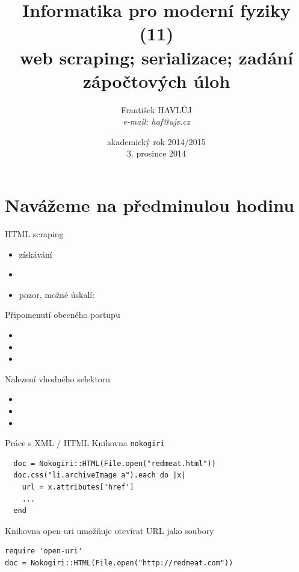 \documentclass{beamer}
\title[IMF (11)]{Informatika pro moderní fyziky (11)\\ web scraping; serializace; zadání zápočtových úloh}
\author[Franti\v{s}ek HAVL\r{U}J, ORF ÚJV Řež]{Franti\v{s}ek HAVL\r{U}J\\{\scriptsize \emph{e-mail: haf@ujv.cz}}}
\date{akademický rok 2014/2015\\3. prosince 2014}
\institute[ORF ÚJV Řež]
{ÚJV Řež\\oddělení Reaktorové fyziky a podpory palivového cyklu}
\begin{document}
\begin{frame}
  \titlepage
\end{frame}

\begin{frame}
  \tableofcontents
\end{frame}

\section{Navážeme na předminulou hodinu}

\begin{frame}{HTML scraping}
  \begin{itemize}
    \item získávání 
    \item 
    \item pozor, možné úskalí:
  \end{itemize}
\end{frame}

\begin{frame}{Připomenutí obecného postupu}
  \begin{itemize}
    \item 
    \item 
    \item 
  \end{itemize}
\end{frame}

\begin{frame}{Nalezení vhodného selektoru}
  \begin{itemize}
    \item 
    \item 
    \item 
  \end{itemize}
\end{frame}


\begin{frame}[fragile]{Práce s XML / HTML}
  Knihovna \texttt{nokogiri}
  \scriptsize
\begin{verbatim}
  doc = Nokogiri::HTML(File.open("redmeat.html"))
  doc.css("li.archiveImage a").each do |x|
    url = x.attributes['href']
    ...
  end
\end{verbatim}
\end{frame}

\begin{frame}[fragile]{Knihovna open-uri}
umožňuje otevírat URL jako soubory
  \scriptsize
\begin{verbatim}
require 'open-uri'
doc = Nokogiri::HTML(File.open("http://redmeat.com"))
\end{verbatim}
\end{frame}
\end{document}
